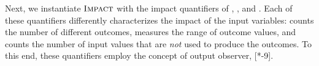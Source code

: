 Next, we instantiate $\textup{\textsc{Impact}}$ with the impact quantifiers of \outcomesname{}, \rangename{}, and \qusedname{}. Each of these quantifiers differently characterizes the impact of the input variables: \outcomesname{} counts the number of different outcomes, \rangename{} measures the range of outcome values, and \qusedname{} counts the number of input values that are \emph{not} used to produce the outcomes.
To this end, these quantifiers employ the concept of output observer, \cf{} [*-9].



